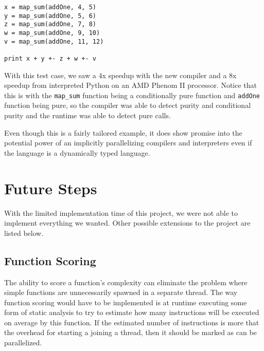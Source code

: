 \documentclass{acm_proc_article-sp}
\begin{document}
\begin{verbatim}
x = map_sum(addOne, 4, 5)                                                                                                                                                                                           
y = map_sum(addOne, 5, 6)                                                                                                                                                                                           
z = map_sum(addOne, 7, 8)                                                                                                                                                                                           
w = map_sum(addOne, 9, 10)                                                                                                                                                                                          
v = map_sum(addOne, 11, 12)                                                                                                                                                                                         
                                                                                                                                                                                                                    
print x + y +- z + w +- v
\end{verbatim}

With this test case, we saw a 4x speedup with the new compiler and a 8x
speedup from interpreted Python on an AMD Phenom II processor. Notice that
this is with the \verb|map_sum| function being a conditionally pure function
and \verb|addOne| function being pure, so the compiler was able to detect purity
and conditional purity and the runtime was able to detect pure calls.

Even though this is a fairly tailored example, it does show promise into the potential
power of an implicitly parallelizing compilers and interpreters even if the language
is a dynamically typed language. 

\section*{Future Steps}
With the limited implementation time of this project, we were not able to implement everything
we wanted. Other possible extensions to the project are listed below.

\subsection*{Function Scoring}
The ability to score a function's complexity can eliminate the problem where
simple functions are unnecessarily spawned in a separate thread. The way function
scoring would have to be implemented is at runtime executing some form of static
analysis to try to estimate how many instructions will be executed on average by
this function. If the estimated number of instructions is more that the overhead
for starting a joining a thread, then it should be marked as can be parallelized.
\end{document}
